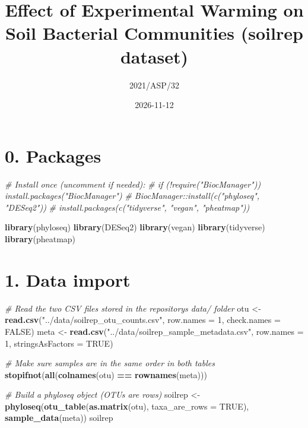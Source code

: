 \documentclass[
]{article}
\title{Effect of Experimental Warming on Soil Bacterial Communities
(soilrep dataset)}
\author{2021/ASP/32}
\date{2026-11-12}
\newenvironment{Shaded}{\begin{snugshade}}{\end{snugshade}}
\newcommand{\AttributeTok}[1]{\textcolor[rgb]{0.13,0.29,0.53}{#1}}
\newcommand{\CommentTok}[1]{\textcolor[rgb]{0.56,0.35,0.01}{\textit{#1}}}
\newcommand{\ConstantTok}[1]{\textcolor[rgb]{0.56,0.35,0.01}{#1}}
\newcommand{\DecValTok}[1]{\textcolor[rgb]{0.00,0.00,0.81}{#1}}
\newcommand{\FunctionTok}[1]{\textcolor[rgb]{0.13,0.29,0.53}{\textbf{#1}}}
\newcommand{\NormalTok}[1]{#1}
\newcommand{\OtherTok}[1]{\textcolor[rgb]{0.56,0.35,0.01}{#1}}
\newcommand{\SpecialCharTok}[1]{\textcolor[rgb]{0.81,0.36,0.00}{\textbf{#1}}}
\newcommand{\StringTok}[1]{\textcolor[rgb]{0.31,0.60,0.02}{#1}}
\begin{document}
\maketitle

{
\setcounter{tocdepth}{2}
\tableofcontents
}
\section{0. Packages}\label{packages}

\begin{Shaded}
\begin{Highlighting}[]
\CommentTok{\# Install once (uncomment if needed):}
\CommentTok{\# if (!require("BiocManager")) install.packages("BiocManager")}
\CommentTok{\# BiocManager::install(c("phyloseq", "DESeq2"))}
\CommentTok{\# install.packages(c("tidyverse", "vegan", "pheatmap"))}

\FunctionTok{library}\NormalTok{(phyloseq)}
\FunctionTok{library}\NormalTok{(DESeq2)}
\FunctionTok{library}\NormalTok{(vegan)}
\FunctionTok{library}\NormalTok{(tidyverse)}
\FunctionTok{library}\NormalTok{(pheatmap)}
\end{Highlighting}
\end{Shaded}

\section{1. Data import}\label{data-import}

\begin{Shaded}
\begin{Highlighting}[]
\CommentTok{\# Read the two CSV files stored in the repository\textquotesingle{}s data/ folder}
\NormalTok{otu  }\OtherTok{\textless{}{-}} \FunctionTok{read.csv}\NormalTok{(}\StringTok{"../data/soilrep\_otu\_counts.csv"}\NormalTok{, }\AttributeTok{row.names =} \DecValTok{1}\NormalTok{, }\AttributeTok{check.names =} \ConstantTok{FALSE}\NormalTok{)}
\NormalTok{meta }\OtherTok{\textless{}{-}} \FunctionTok{read.csv}\NormalTok{(}\StringTok{"../data/soilrep\_sample\_metadata.csv"}\NormalTok{, }\AttributeTok{row.names =} \DecValTok{1}\NormalTok{,}
                 \AttributeTok{stringsAsFactors =} \ConstantTok{TRUE}\NormalTok{)}

\CommentTok{\# Make sure samples are in the same order in both tables}
\FunctionTok{stopifnot}\NormalTok{(}\FunctionTok{all}\NormalTok{(}\FunctionTok{colnames}\NormalTok{(otu) }\SpecialCharTok{==} \FunctionTok{rownames}\NormalTok{(meta)))}

\CommentTok{\# Build a phyloseq object (OTUs are rows)}
\NormalTok{soilrep }\OtherTok{\textless{}{-}} \FunctionTok{phyloseq}\NormalTok{(}\FunctionTok{otu\_table}\NormalTok{(}\FunctionTok{as.matrix}\NormalTok{(otu), }\AttributeTok{taxa\_are\_rows =} \ConstantTok{TRUE}\NormalTok{),}
                    \FunctionTok{sample\_data}\NormalTok{(meta))}
\NormalTok{soilrep}
\end{Highlighting}
\end{Shaded}
\end{document}
